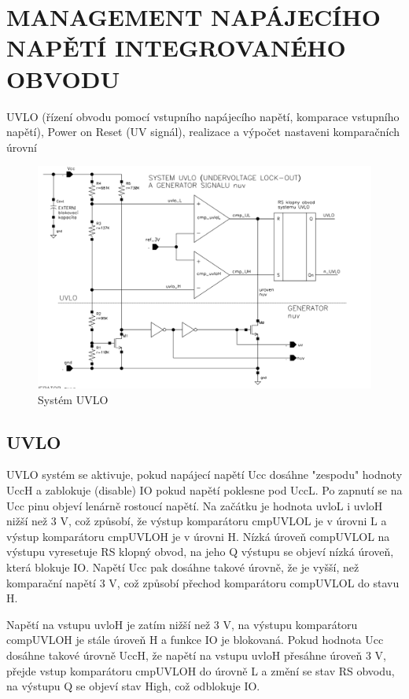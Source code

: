\section{MANAGEMENT NAPÁJECÍHO NAPĚTÍ INTEGROVANÉHO OBVODU}
UVLO (řízení obvodu pomocí vstupního napájecího napětí, komparace vstupního napětí), Power on Reset (UV signál), realizace a výpočet nastaveni komparačních úrovní

\begin{figure}[h]
   \begin{center}
     \includegraphics[scale=0.5]{images/UVLO.png}
   \end{center}
   \caption{Systém UVLO}
\end{figure}

\subsection{UVLO}
UVLO systém se aktivuje, pokud napájecí napětí Ucc dosáhne "zespodu" hodnoty UccH a zablokuje (disable) IO pokud napětí poklesne pod UccL. Po zapnutí se na Ucc pinu objeví lenárně rostoucí napětí. Na začátku je hodnota uvloL i uvloH nižší než 3 V, což způsobí, že výstup komparátoru cmpUVLOL je v úrovni L a výstup komparátoru cmpUVLOH je v úrovni H. Nízká úroveň compUVLOL na výstupu vyresetuje RS klopný obvod, na jeho Q výstupu se objeví nízká úroveň, která blokuje IO. Napětí Ucc pak dosáhne takové úrovně, že je vyšší, než komparační napětí 3 V, což způsobí přechod komparátoru compUVLOL do stavu H.

Napětí na vstupu uvloH je zatím nižší než 3 V, na výstupu komparátoru compUVLOH je stále úroveň H a funkce IO je blokovaná. Pokud hodnota Ucc dosáhne takové úrovně UccH, že napětí na vstupu uvloH přesáhne úroveň 3 V, přejde vstup komparátoru cmpUVLOH do úrovně L a změní se stav RS obvodu, na výstupu Q se objeví stav High, což odblokuje IO.

